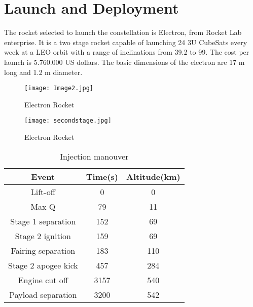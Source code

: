 \section{Launch and Deployment}
The rocket selected to launch the constellation is Electron, from Rocket Lab enterprise.    It is a two stage rocket capable of launching 24 3U CubeSats every week at a LEO orbit with a range of inclinations from 39.2 to 99. The cost per launch is 5.760.000 US dollars. The basic dimensions of the electron are 17 m long and 1.2 m diameter.   
\begin{figure}[H]
\begin{center}
\texttt{[image: Image2.jpg]} 
\caption{Electron Rocket}
\end{center}
\end{figure}
\begin{figure}[H]
\begin{center}
\texttt{[image: secondstage.jpg]} 
\caption{Electron Rocket}
\end{center}
\end{figure}
\begin{table}[H]
\begin{center}
\begin{tabular}{|c|c|c|}
\hline
\rowcolor{blue} \textbf{Event}&\textbf{Time(s)}&\textbf{Altitude(km)}\\
\hline
Lift-off&0&0\\
\hline
Max Q&79&11\\
\hline
Stage 1 separation&152&69\\
\hline
Stage 2 ignition&159&69\\
\hline
Fairing separation&183&110\\
\hline
Stage 2 apogee kick&457&284\\
\hline
Engine cut off&3157&540\\
\hline
Payload separation&3200&542\\
\hline
\end{tabular}
\caption{Injection manouver}
\end{center}
\end{table}



